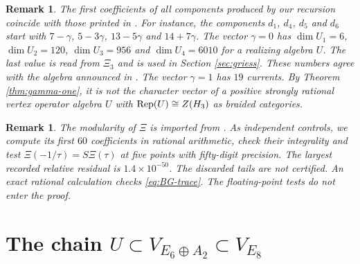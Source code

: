 \documentclass[leqno]{article}
\let\cal\relax
\newcommand{\cal}{\mathcal}
\DeclareMathOperator{\Rep}{Rep}
\newtheorem{remark}[thm]{Remark}
\numberwithin{equation}{section}
\begin{document}
\begin{remark}\normalfont
\label{rem:EG-coefficients}
The first coefficients of all components produced by our recursion coincide with those printed in \cite[p.~22]{EvG11}. For instance, the components $d_1$, $d_4$, $d_5$ and $d_6$ start with $7-\gamma$, $5-3\gamma$, $13-5\gamma$ and $14+7\gamma$. The vector $\gamma = 0$ has $\dim U_1 = 6$, $\dim U_2 = 120$, $\dim U_3 = 956$ and $\dim U_4 = 6010$ for a realizing algebra $U$. The last value is read from $\Xi_3$ and is used in Section \ref{sec:griess}. These numbers agree with the algebra announced in \cite{Rie26,Hua26}. The vector $\gamma = 1$ has $19$ currents. By Theorem \ref{thm:gamma-one}, it is not the character vector of a positive strongly rational vertex operator algebra $U$ with $\Rep(U) \cong Z(\cal H_3)$ as braided categories.
\end{remark}

\begin{remark}\normalfont
The modularity of $\Xi$ is imported from \cite[Section 2.4]{EvG11}. As independent controls, we compute its first $60$ coefficients in rational arithmetic, check their integrality and test $\Xi(-1/\tau) = S\Xi(\tau)$ at five points with fifty-digit precision. The largest recorded relative residual is $1.4\times10^{-50}$. The discarded tails are not certified. An exact rational calculation checks \eqref{eq:BG-trace}. The floating-point tests do not enter the proof.
\end{remark}

\section{The chain \texorpdfstring{$U \subset V_{E_6 \oplus A_2} \subset V_{E_8}$}{U < V(E6+A2) < V(E8)}}
\label{sec:chain}
\end{document}
